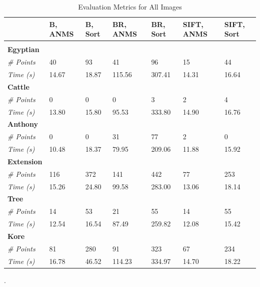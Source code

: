 \documentclass[12pt]{article}
\begin{document}
\begin{table}[bp]
\caption{Evaluation Metrics for All Images}
\label{image}
\begin{center}
\begin{tabular}{l|llllll}
\multicolumn{1}{l}{} & \multicolumn{1}{l}{\bf B, ANMS} & \multicolumn{1}{l}{\bf B, Sort} & \multicolumn{1}{l}{\bf BR, ANMS} & \multicolumn{1}{l}{\bf BR, Sort} & \multicolumn{1}{l}{\bf SIFT, ANMS} & \multicolumn{1}{l}{\bf SIFT, Sort}
\\ \hline \\
{\bf Egyptian} \\
{\it \# Points} & 40 & 93 & 41 & 96 & 15 & 44 \\
{\it Time (s)} & 14.67 & 18.87 & 115.56 & 307.41 & 14.31 & 16.64 \\
{\bf Cattle} \\
{\it \# Points} & 0 & 0 & 0 & 3 & 2 & 4 \\
{\it Time (s)} & 13.80 & 15.80 & 95.53 & 333.80 & 14.90 & 16.76 \\
{\bf Anthony} \\
{\it \# Points} & 0 & 0 & 31 & 77 & 2 & 0 \\
{\it Time (s)} & 10.48 & 18.37 & 79.95 & 209.06 & 11.88 & 15.92 \\
{\bf Extension} \\
{\it \# Points} & 116 & 372 & 141 & 442 & 77 & 253 \\
{\it Time (s)} & 15.26 & 24.80 & 99.58 & 283.00 & 13.06 & 18.14 \\
{\bf Tree} \\
{\it \# Points} & 14 & 53 & 21 & 55 & 14 & 55 \\
{\it Time (s)} & 12.54 & 16.54 & 87.49 & 259.82 & 12.08 & 15.42 \\
{\bf Kore} \\
{\it \# Points} & 81 & 280 & 91 & 323 & 67 & 234 \\
{\it Time (s)} & 16.78 & 46.52 & 114.23 & 334.97 & 14.70 & 18.22 \\
\end{tabular}
\end{center}
\end{table}.
\end{document}
